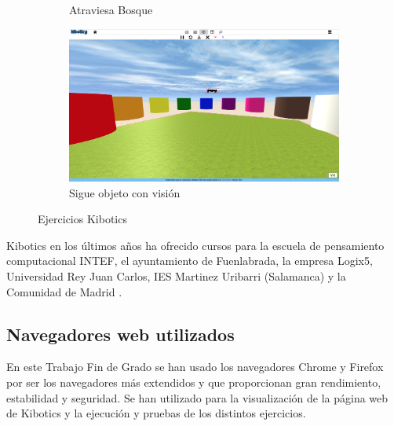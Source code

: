 \begin{figure}[H]
\begin{subfigure}{.5\textwidth}
  \caption{Atraviesa Bosque}
  \label{fig:sub-third}
\end{subfigure}
\begin{subfigure}{.5\textwidth}
  \centering
  \includegraphics[width=.95\linewidth]{chapters/images/colores.png}  
  \caption{Sigue objeto con visión}
  \label{fig:sub-fourth}
\end{subfigure}
\caption{Ejercicios Kibotics}
\label{fig:partes robot}
\end{figure}


Kibotics en los últimos años ha ofrecido cursos para la escuela de pensamiento computacional INTEF, el ayuntamiento de Fuenlabrada, la empresa Logix5, Universidad Rey Juan Carlos, IES Martinez Uribarri (Salamanca) y la Comunidad de Madrid \cite{kiboticspdf}.


\subsection{Navegadores web utilizados}

En este Trabajo Fin de Grado se han usado los navegadores Chrome y Firefox por ser los navegadores más extendidos y que proporcionan gran rendimiento, estabilidad y seguridad. Se han utilizado para la visualización de la página web de Kibotics y la ejecución y pruebas de los distintos ejercicios. 
